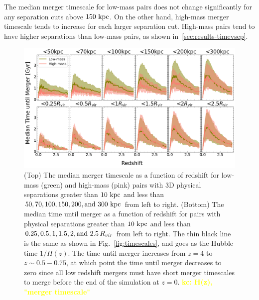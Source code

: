 \documentclass[twocolumn,linenumbers]{aastex631}
\newcommand{\kc}[1]{\textcolor{yellow}{\textbf{kc: #1}} }
\begin{document}
        The median merger timescale for low-mass pairs does not change significantly for any separation cuts above $150\,\mathrm{\,kpc}$. 
        On the other hand, high-mass merger timescale tends to increase for each larger separation cut. 
        High-mass pairs tend to have higher separations than low-mass pairs, as shown in~\ref{sec:results-timevsep}. 
    \begin{figure}[htb]
        \centering
        \includegraphics[width=\textwidth]{plots/bet-on-it/3_time_til_merger.png}
        \caption{(Top) The median merger timescale as a function of redshift for low-mass (green) and high-mass (pink) pairs with 3D physical separations greater than $10\,\mathrm{\,kpc}$ and less than $50,70,100,150,200,\mbox{and }300\,\mathrm{\,kpc}$ from left to right. 
        (Bottom) The median time until merger as a function of redshift for pairs with physical separations greater than $10\,\mathrm{\,kpc}$ and less than $0.25, 0.5, 1, 1.5, 2,\mbox{and }2.5\,R_{vir}$ from left to right. 
        The thin black line is the same as shown in Fig.~\ref{fig:timescales}, and goes as the Hubble time $1/H(z)$.
        The time until merger increases from $z=4$ to $z\sim0.5-0.75$, at which point the time until merger decreases to zero since all low redshift mergers must have short merger timescales to merge before the end of the simulation at $z=0$. 
        \kc{H(z), "merger timescale"}
        }
        \label{fig:timescales-sep}
    \end{figure}  
\end{document}
